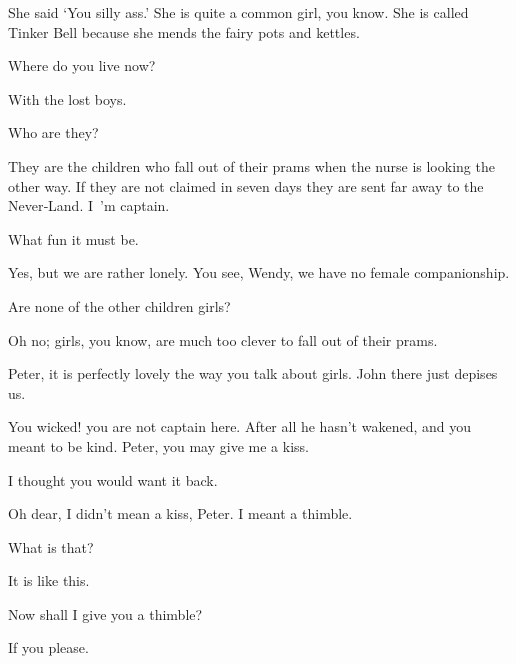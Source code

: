 \begin{drama}
\peterspeaks
She said ‘You silly ass.’
She is quite a common girl, you know.
She is called Tinker Bell because she mends the fairy pots and kettles.


\wendyspeaks
Where do you live now?

\peterspeaks
With the lost boys.

\wendyspeaks
Who are they?

\peterspeaks
They are the children who fall out of their prams when the nurse is looking the other way.
If they are not claimed in seven days they are sent far away to the Never‐Land.
I~’m captain.

\wendyspeaks
What fun it must be.

Yes, but we are rather lonely.
You see, Wendy, we have no female companionship.

\wendyspeaks
Are none of the other children girls?

\peterspeaks
Oh no; girls, you know, are much too clever to fall out of their prams.

\wendyspeaks
Peter, it is perfectly lovely the way you talk about girls.
John there just depises us.


\speakercontinues
You wicked!
you are not captain here.
After all he hasn’t wakened, and you meant to be kind.
Peter, you may give me a kiss.

I thought you would want it back.

Oh dear, I didn’t mean a kiss, Peter.
I meant a thimble.

What is that?

\wendyspeaks
It is like this.

Now shall I give you a thimble?

\wendyspeaks
If you please.


\end{drama}
